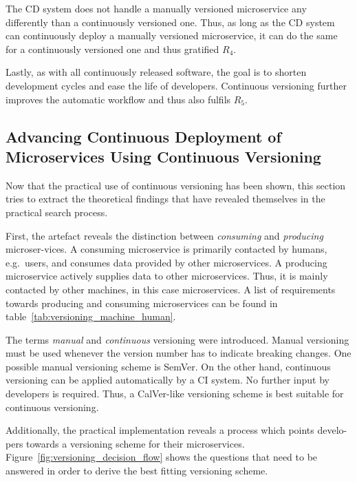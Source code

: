 The \ac{CD} system does not handle a manually versioned microservice any
differently than a continuously versioned one. Thus, as long as the \ac{CD}
system can continuously deploy a manually versioned microservice, it can do the
same for a continuously versioned one and thus gratified $R_4$.

Lastly, as with all continuously released software, the goal is to shorten
development cycles and ease the life of developers. Continuous versioning
further improves the automatic workflow and thus also fulfils $R_5$.

\subsection{Advancing Continuous Deployment of Microservices Using Continuous Versioning}%
\label{sub:Advancing_Continuous_Deployment_of_Microservices_using_XXX_Versioning}
Now that the practical use of continuous versioning has been shown, this
section tries to extract the theoretical findings that have revealed themselves
in the practical search process.

First, the artefact reveals the distinction between \textit{consuming} and
\textit{producing} microser-vices. A consuming microservice is primarily
contacted by humans, e.g.\ users, and consumes data provided by other
microservices. A producing microservice actively supplies data to other
microservices. Thus, it is mainly contacted by other machines, in this case
microservices. A list of requirements towards producing and consuming
microservices can be found in table~\ref{tab:versioning_machine_human}.

The terms \textit{manual} and \textit{continuous} versioning were introduced.
Manual versioning must be used whenever the version number has to indicate
breaking changes. One possible manual versioning scheme is SemVer. On the other
hand, continuous versioning can be applied automatically by a \ac{CI} system.
No further input by developers is required. Thus, a CalVer-like versioning
scheme is best suitable for continuous versioning.

Additionally, the practical implementation reveals a process which points
develo-pers towards a versioning scheme for their microservices.
Figure~\ref{fig:versioning_decision_flow} shows the questions that need to be
answered in order to derive the best fitting versioning scheme.


